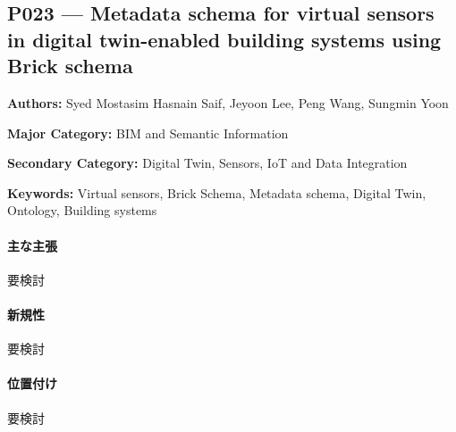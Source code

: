 \subsection{P023 --- Metadata schema for virtual sensors in digital twin-enabled building systems using Brick schema}
\label{paper:P023}
\textbf{Authors:} Syed Mostasim Hasnain Saif, Jeyoon Lee, Peng Wang, Sungmin Yoon\par
\textbf{Major Category:} BIM and Semantic Information\par
\textbf{Secondary Category:} Digital Twin, Sensors, IoT and Data Integration\par
\textbf{Keywords:} Virtual sensors, Brick Schema, Metadata schema, Digital Twin, Ontology, Building systems\par
\paragraph{主な主張}
要検討 \cite{Saif:2026VirtualSensorBrick}
\paragraph{新規性}
要検討
\paragraph{位置付け}
要検討

